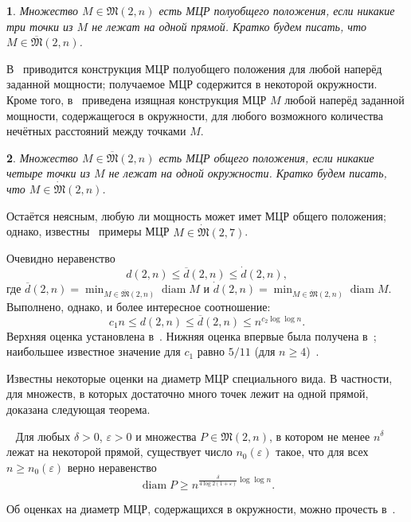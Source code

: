 \documentclass[11pt,twoside,draft
]{article}
\newtheorem{Definition}{\indent {\sc Definition}}
\begin{document}
\begin{Definition}
	Множество $M\in\mathfrak{M}(2,n)$ есть МЦР \textit{полуобщего положения},
	если никакие три точки из $M$ не лежат на одной прямой.
	Кратко будем писать, что $M\in \overline{\mathfrak{M}}(2,n)$.
\end{Definition}

В~\cite{harborth1993upper} приводится конструкция МЦР полуобщего положения для любой наперёд заданной мощности;
получаемое МЦР содержится в некоторой окружности.
Кроме того, в~\cite{piepmeyer1996maximum} приведена изящная конструкция МЦР $M$ любой наперёд заданной мощности,
содержащегося в окружности,
для любого возможного количества нечётных расстояний между точками $M$.

\begin{Definition}
	Множество $M\in\overline{\mathfrak{M}}(2,n)$ есть МЦР \textit{общего положения},
	если никакие четыре точки из $M$ не лежат на одной окружности.
	Кратко будем писать, что $M\in \dot{\mathfrak{M}}(2,n)$.
\end{Definition}

Остаётся неясным, любую ли мощность может имет МЦР общего положения;
однако, известны~\cite{kreisel2008heptagon,kurz2013constructing} примеры МЦР $M\in \dot{\mathfrak{M}}(2,7)$.

Очевидно неравенство
\begin{equation*}
	d(2,n) \leq \overline{d}(2,n) \leq \dot{d}(2,n)
	,
\end{equation*}
где
$
	\overline{d}(2,n) = \min_{M\in\overline{\mathfrak{M}}(2,n)} \operatorname{diam} M
$
и
$
	\dot{d}(2,n) = \min_{M\in\dot{\mathfrak{M}}(2,n)} \operatorname{diam} M
$.
Выполнено, однако, и более интересное соотношение:
\begin{equation*}
	c_1 n \leq d(2,n) \leq \overline{d}(2,n) \leq n^{c_2 \log \log n}
	.
\end{equation*}
Верхняя оценка установлена в~\cite{harborth1993upper}.
Нижняя оценка впервые была получена в~\cite{solymosi2003note};
наибольшее известное значение для $c_1$ равно $5/11$ (для $n\geq 4$)~\cite{my-pps-linear-bound-2019}.

Известны некоторые оценки на диаметр МЦР специального вида.
В частности, для множеств, в которых достаточно много точек лежит на одной прямой,
доказана следующая теорема.
\begin{Theorem}~\cite[Theorem 4]{kurz2008minimum}
	Для любых $\delta > 0$, $\varepsilon > 0$ и множества $P\in\mathfrak{M}(2,n)$,
	в котором не менее $n^\delta$ лежат на некоторой прямой, существует число $n_0 (\varepsilon)$
	такое, что для всех $n \geq n_0 (\varepsilon)$ верно неравенство
	\begin{equation}
		\operatorname{diam} P \geq n^{\frac{\delta}{4 \log 2(1+\varepsilon)}\log \log n}
		.
	\end{equation}
\end{Theorem}
Об оценках на диаметр МЦР,
содержащихся в окружности, можно прочесть в~\cite{bat2018number}.
\end{document}
